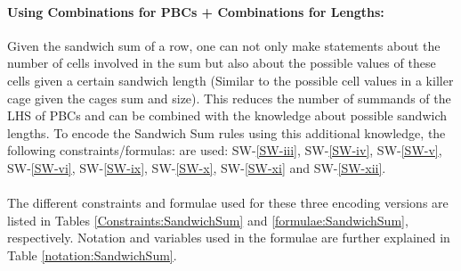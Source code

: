 \paragraph{Using Combinations for PBCs + Combinations for Lengths:} Given the sandwich sum of a row, one can not only make statements about the number of cells involved in the sum but also about the possible values of these cells given a certain sandwich length (Similar to the possible cell values in a killer cage given the cages sum and size). This reduces the number of summands of the LHS of PBCs and can be combined with the knowledge about possible sandwich lengths. To encode the Sandwich Sum rules using this additional knowledge, the following constraints/formulas: are used: SW-\ref{SW-iii}, SW-\ref{SW-iv}, SW-\ref{SW-v}, SW-\ref{SW-vi}, SW-\ref{SW-ix}, SW-\ref{SW-x}, SW-\ref{SW-xi} and SW-\ref{SW-xii}.\\
\\
The different constraints and formulae used for these three encoding versions are listed in Tables \ref{Constraints:SandwichSum} and \ref{formulae:SandwichSum}, respectively. Notation and variables used in the formulae are further explained in Table \ref{notation:SandwichSum}.

